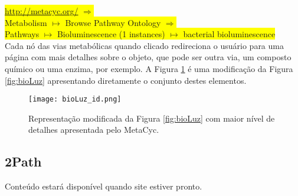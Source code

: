 \indent \colorbox{yellow}{\url{http://metacyc.org/} $\Rightarrow$} \\
\indent \colorbox{yellow}{Metabolism $\mapsto$ Browse Pathway Ontology $\Rightarrow$} \\
\indent \colorbox{yellow}{Pathways $\mapsto$ Bioluminescence (1 instances) $\mapsto$ bacterial bioluminescence} \\

\indent Cada nó das vias metabólicas quando clicado redireciona o usuário para uma página com mais detalhes sobre o objeto, que pode ser outra via, um composto químico ou uma enzima, por exemplo. A Figura \ref{bioLuz_id} é uma modificação da Figura \ref{fig:bioLuz} apresentando diretamente o conjunto destes elementos.

\begin{figure}[!h]
\centering
\texttt{[image: bioLuz\_id.png]}
\caption{Representação modificada da Figura \ref{fig:bioLuz} com maior nível de detalhes apresentada pelo MetaCyc.}
\label{bioLuz_id}
\end{figure}



\subsection{2Path}

\indent Conteúdo estará disponível quando site estiver pronto. \\


